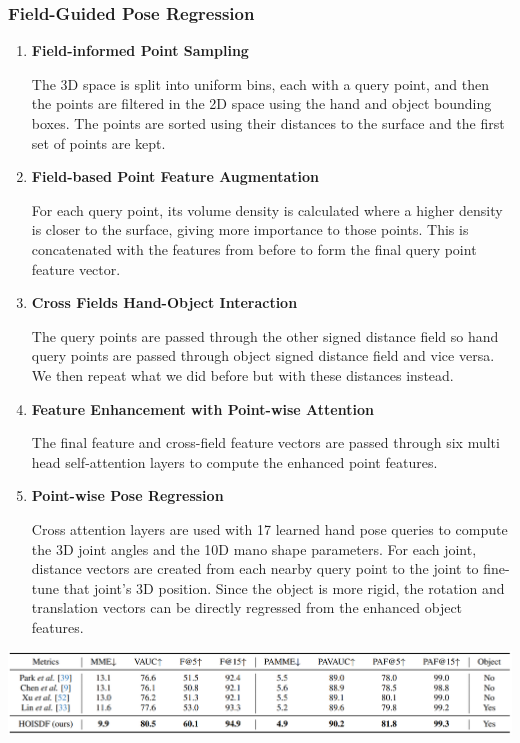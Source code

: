 \documentclass{article}
\begin{document}
\subsubsection*{Field-Guided Pose Regression}
\begin{enumerate}
    \item \textbf{Field-informed Point Sampling}
    
    The 3D space is split into uniform bins, each with a query point, and then the points are
    filtered in the 2D space using the hand and object bounding boxes. The points are sorted using
    their distances to the surface and the first set of points are kept.
    
    \item \textbf{Field-based Point Feature Augmentation}
    
    For each query point, its volume density is calculated where a higher density is closer to the
    surface, giving more importance to those points. This is concatenated with the features from
    before to form the final query point feature vector.

    \item \textbf{Cross Fields Hand-Object Interaction}
    
    The query points are passed through the other signed distance field so hand query points are
    passed through object signed distance field and vice versa. We then repeat what we did before
    but with these distances instead.

    \item \textbf{Feature Enhancement with Point-wise Attention}
    
    The final feature and cross-field feature vectors are passed through six multi head
    self-attention layers to compute the enhanced point features.

    \item \textbf{Point-wise Pose Regression}
    
    Cross attention layers are used with 17 learned hand pose queries to compute the 3D joint
    angles and the 10D mano shape parameters. For each joint, distance vectors are created from
    each nearby query point to the joint to fine-tune that joint’s 3D position. Since the object is
    more rigid, the rotation and translation vectors can be directly regressed from the enhanced
    object features.
\end{enumerate}

\begin{center}
    \includegraphics[scale=0.3]{hoisdf-3.png}
\end{center}
\end{document}
